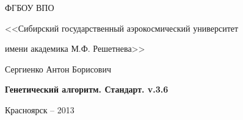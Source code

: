 \thispagestyle{empty}

\begin{center}
ФГБОУ ВПО \par
<<Сибирский государственный аэрокосмический университет \par имени академика М.Ф. Решетнева>>\par 
\par
\end{center}

\vspace{20mm}

\vspace{30mm}
\begin{center}
{\large Сергиенко Антон Борисович}
\end{center}

\vspace{5mm}
\begin{center}
{\bf \large Генетический алгоритм. Стандарт. v.3.6
\par}

\vspace{10mm}

\vspace{10mm}

\end{center}

\vspace{80mm}

\vspace{20mm}
\begin{center}
{Красноярск -- 2013}
\end{center}

\newpage